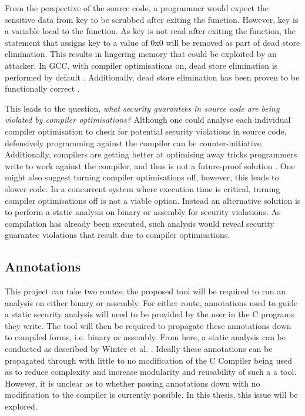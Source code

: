 From the perspective of the source code, a programmer would expect the sensitive data from key to be scrubbed after exiting the function. However, key is a variable local to the function. As key is not read after exiting the function, the statement that assigns key to a value of 0x0 will be removed as part of dead store elimination. This results in lingering memory that could be exploited by an attacker. In GCC, with compiler optimisations on, dead store elimination is performed by default \cite{gccoptimise}. Additionally, dead store elimination has been proven to be functionally correct \cite{benton2004simple}\cite{leroy2006formal}.


This leads to the question, \textit{what security guarantees in source code are being violated by compiler optimisations?} Although one could analyse each individual compiler optimisation to check for potential security violations in source code, defensively programming against the compiler can be counter-initiative. Additionally, compilers are getting better at optimising away tricks programmers write to work against the compiler, and thus is not a future-proof solution \cite{simon2018you}. One might also suggest turning compiler optimisations off, however, this leads to slower code. In a concurrent system where execution time is critical, turning compiler optimisations off is not a viable option. Instead an alternative solution is to perform a static analysis on binary or assembly for security violations. As compilation has already been executed, such analysis would reveal security guarantee violations that result due to compiler optimisations.

\subsection{Annotations}
This project can take two routes; the proposed tool will be required to run an analysis on either binary or assembly. For either route, annotations used to guide a static security analysis will need to be provided by the user in the C programs they write. The tool will then be required to propagate these annotations down to compiled forms, i.e. binary or assembly. From here, a static analysis can be conducted as described by Winter et al. \cite{winter2020information}. Ideally these annotations can be propagated through with little to no modification of the C Compiler being used as to reduce complexity and increase modularity and reusability of such a a tool. However, it is unclear as to whether passing annotations down with no modification to the compiler is currently possible. In this thesis, this issue will be explored.

